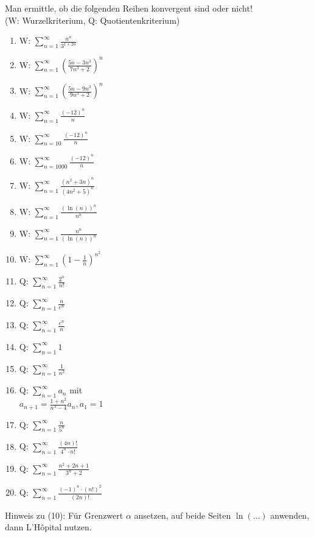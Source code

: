 \item Man ermittle, ob die folgenden Reihen konvergent sind oder nicht! \\ (W: Wurzelkriterium, Q: Quotientenkriterium)

\begin{multicols}{2}
	\begin{enumerate}[label=(\arabic*)]
		\item W: $\sum_{n=1}^{\infty} \frac{n^n}{3^{1+2n}}$
		\item W: $\sum_{n=1}^{\infty} \left(\frac{5n-3n^3}{7n^3+2}\right)^n$
		\item W: $\sum_{n=1}^{\infty} \left(\frac{5n-9n^3}{9n^3+2}\right)^n$
		\item W: $\sum_{n=1}^{\infty} \frac{(-12)^n}{n}$
		\item W: $\sum_{n=10}^{\infty} \frac{(-12)^n}{n}$
		\item W: $\sum_{n=1000}^{\infty} \frac{(-12)^n}{n}$
		\item W: $\sum_{n=1}^{\infty} \frac{(n^2+3n)^n}{(4n^2+5)^n}$
		\item W: $\sum_{n=1}^{\infty} \frac{(\ln(n))^n}{n^n}$
		\item W: $\sum_{n=1}^{\infty} \frac{n^n}{(\ln(n))^n}$
		\item W: $\sum_{n=1}^{\infty} \left(1-\frac{1}{n}\right)^{n^2}$
		\item Q: $\sum_{n=1}^{\infty} \frac{2^n}{n!}$
		\item Q: $\sum_{n=1}^{\infty} \frac{n}{e^n}$
		\item Q: $\sum_{n=1}^{\infty} \frac{e^n}{n}$
		\item Q: $\sum_{n=1}^{\infty} 1$
		\item Q: $\sum_{n=1}^{\infty} \frac{1}{n^2}$
		\item Q: $\sum_{n=1}^{\infty} a_n$ mit \\ $a_{n+1} = \frac{1+n^2}{n^3-4} a_n, a_1=1$
		\item Q: $\sum_{n=1}^{\infty} \frac{n}{5^n}$
		\item Q: $\sum_{n=1}^{\infty} \frac{(4n)!}{4^n \cdot n!}$
		\item Q: $\sum_{n=1}^{\infty} \frac{n^2+2n+1}{3^n+2}$
		\item Q: $\sum_{n=1}^{\infty} \frac{(-1)^n\cdot(n!)^2}{(2n)!}$
	\end{enumerate}
\end{multicols}
Hinweis zu (10): Für Grenzwert $\alpha$ ansetzen, auf beide Seiten $\ln(\dots)$ anwenden, dann L'Hôpital nutzen.